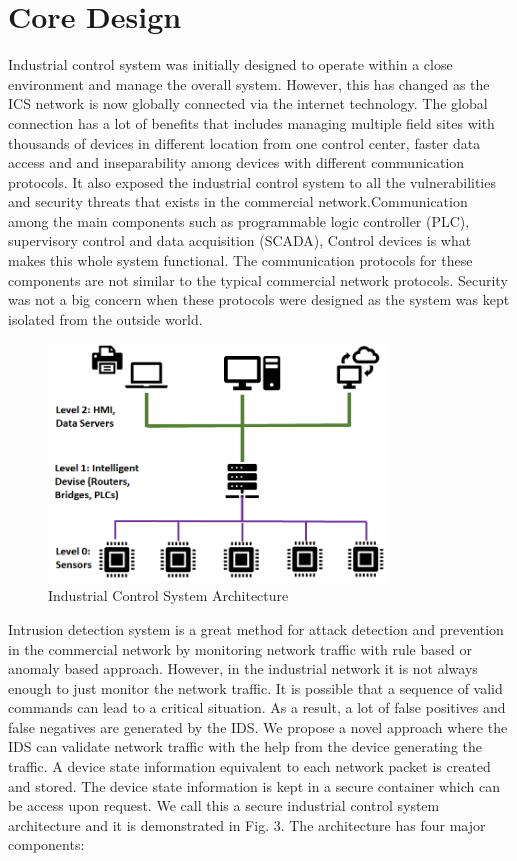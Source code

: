 \documentclass[conference]{IEEEtran}
\begin{document}
\section{Core Design}
Industrial control system was initially designed to operate within a close environment and manage the overall system. However, this has changed as the ICS network is now globally connected via the internet technology. The global connection has a lot of benefits that includes managing multiple field sites with thousands of devices in different location from one control center, faster data access and and inseparability among devices with different communication protocols. It also exposed the industrial control system to all the vulnerabilities and security threats that exists in the commercial network.Communication among the main components such as programmable logic controller (PLC), supervisory control and data acquisition (SCADA), Control devices is what makes this whole system functional. The communication protocols for these components are not similar to the typical commercial network protocols. Security was not a big concern when these protocols were designed as the system was kept isolated from the outside world. 
\begin{figure}[htbp]
\centering
\centerline{\includegraphics [width=9cm] {ICS-Architecture-RelOK.png}}
\caption{Industrial Control System Architecture}
\label{fig}
\end{figure}
Intrusion detection system is a great method for attack detection and prevention in the commercial network by monitoring network traffic with rule based or anomaly based approach. However, in the industrial network it is not always enough to just monitor the network traffic. It is possible that a sequence of valid commands can lead to a critical situation. As a result, a lot of false positives and false negatives are generated by the IDS. We propose a novel approach where the IDS can validate network traffic with the help from the device generating the traffic. A device state information equivalent to each network packet is created and stored. The device state information is kept in a secure container which can be access upon request. We call this a secure industrial control system architecture and it is demonstrated in Fig. 3. The architecture has four major components:
\end{document}

